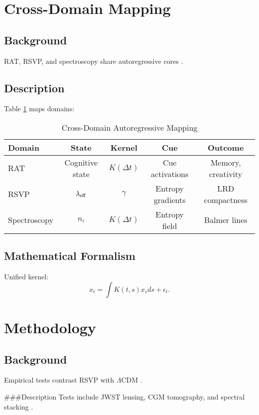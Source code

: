 \documentclass[12pt]{article}
\begin{document}
\section{Cross-Domain Mapping}
\subsection{Background}
RAT, RSVP, and spectroscopy share autoregressive cores \citep{Barenholtz2025, PacucciLoeb2025, Payne1925}.

\subsection{Description}
Table \ref{tab:cross_domain} maps domains:
\begin{table}
\centering
\caption{Cross-Domain Autoregressive Mapping}
\begin{tabular}{lcccc}
\toprule
\textbf{Domain} & \textbf{State} & \textbf{Kernel} & \textbf{Cue} & \textbf{Outcome} \\
\midrule
RAT & Cognitive state & $K(\Delta t)$ & Cue activations & Memory, creativity \\
RSVP & $\lambda_{\rm eff}$ & $\gamma$ & Entropy gradients & LRD compactness \\
Spectroscopy & $n_i$ & $K(\Delta t)$ & Entropy field & Balmer lines \\
\bottomrule
\end{tabular}
\label{tab:cross_domain}
\end{table}

\subsection{Mathematical Formalism}
Unified kernel:
\begin{equation}
x_t = \int K(t,s) x_s ds + \epsilon_t.
\end{equation}

\section{Methodology}
\subsection{Background}
Empirical tests contrast RSVP with $\Lambda$CDM \citep{PacucciLoeb2025, Kocevski2025}.

###{Description}
Tests include JWST lensing, CGM tomography, and spectral stacking \citep{Zhuang2025, Maiolino2025}.
\end{document}
